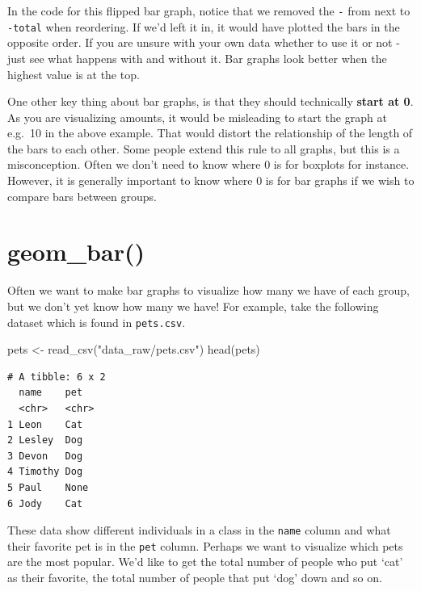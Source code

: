 \documentclass[
  letterpaper,
  DIV=11,
  numbers=noendperiod]{scrreprt}
\newenvironment{Shaded}{\begin{snugshade}}{\end{snugshade}}
\newcommand{\FunctionTok}[1]{\textcolor[rgb]{0.28,0.35,0.67}{#1}}
\newcommand{\NormalTok}[1]{\textcolor[rgb]{0.00,0.23,0.31}{#1}}
\newcommand{\OtherTok}[1]{\textcolor[rgb]{0.00,0.23,0.31}{#1}}
\newcommand{\StringTok}[1]{\textcolor[rgb]{0.13,0.47,0.30}{#1}}
\begin{document}
In the code for this flipped bar graph, notice that we removed the
\texttt{-} from next to \texttt{-total} when reordering. If we'd left it
in, it would have plotted the bars in the opposite order. If you are
unsure with your own data whether to use it or not - just see what
happens with and without it. Bar graphs look better when the highest
value is at the top.

One other key thing about bar graphs, is that they should technically
\textbf{start at 0}. As you are visualizing amounts, it would be
misleading to start the graph at e.g.~10 in the above example. That
would distort the relationship of the length of the bars to each other.
Some people extend this rule to all graphs, but this is a misconception.
Often we don't need to know where 0 is for boxplots for instance.
However, it is generally important to know where 0 is for bar graphs if
we wish to compare bars between groups.

\hypertarget{geom_bar}{%
\section{\texorpdfstring{\textbf{geom\_bar()}}{geom\_bar()}}\label{geom_bar}}

Often we want to make bar graphs to visualize how many we have of each
group, but we don't yet know how many we have! For example, take the
following dataset which is found in \texttt{pets.csv}.

\begin{Shaded}
\begin{Highlighting}[]
\NormalTok{pets }\OtherTok{\textless{}{-}} \FunctionTok{read\_csv}\NormalTok{(}\StringTok{"data\_raw/pets.csv"}\NormalTok{)}
\FunctionTok{head}\NormalTok{(pets)}
\end{Highlighting}
\end{Shaded}

\begin{verbatim}
# A tibble: 6 x 2
  name    pet  
  <chr>   <chr>
1 Leon    Cat  
2 Lesley  Dog  
3 Devon   Dog  
4 Timothy Dog  
5 Paul    None 
6 Jody    Cat  
\end{verbatim}

These data show different individuals in a class in the \texttt{name}
column and what their favorite pet is in the \texttt{pet} column.
Perhaps we want to visualize which pets are the most popular. We'd like
to get the total number of people who put `cat' as their favorite, the
total number of people that put `dog' down and so on.
\end{document}
